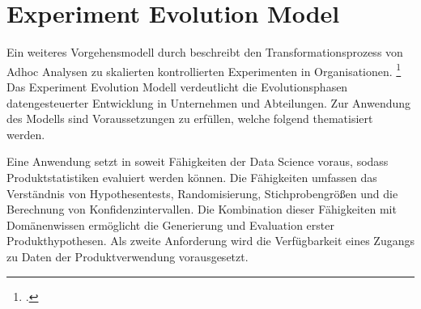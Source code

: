 \section{Experiment Evolution Model}

Ein weiteres Vorgehensmodell durch  beschreibt den Transformationsprozess von Adhoc Analysen zu skalierten kontrollierten Experimenten in Organisationen. \footcite[Vgl.][S. 5]{Fabijan.2017}
Das Experiment Evolution Modell verdeutlicht die Evolutionsphasen datengesteuerter Entwicklung in Unternehmen und Abteilungen.
Zur Anwendung des Modells sind Voraussetzungen zu erfüllen, welche folgend thematisiert werden.

Eine Anwendung setzt in soweit Fähigkeiten der Data Science voraus, sodass Produktstatistiken evaluiert werden können.
Die Fähigkeiten umfassen das Verständnis von Hypothesentests, Randomisierung, Stichprobengrößen und die Berechnung von Konfidenzintervallen. %
Die Kombination dieser Fähigkeiten mit Domänenwissen ermöglicht die Generierung und Evaluation erster Produkthypothesen.
Als zweite Anforderung wird die Verfügbarkeit eines Zugangs zu Daten der Produktverwendung vorausgesetzt.


